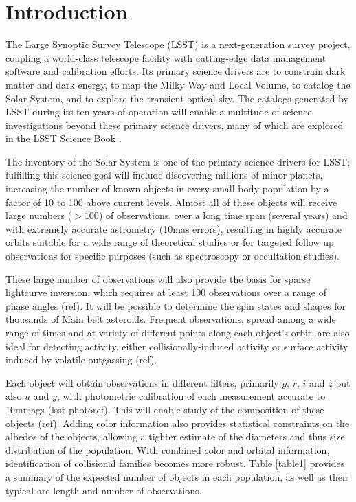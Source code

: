 \documentclass{iau}
\begin{document}
\section{Introduction}

The Large Synoptic Survey Telescope (LSST) is a next-generation survey
project, coupling a world-class telescope facility with cutting-edge
data management software and calibration efforts. Its primary science
drivers are to constrain dark matter and dark energy, to map the Milky
Way and Local Volume, to catalog the Solar System, and to explore
the transient optical sky. The catalogs generated by LSST during its
ten years of operation will enable a multitude of science
investigations beyond these primary science drivers, many of which are
explored in the LSST Science Book \cite{scibook}.

The inventory of the Solar System is one of the primary science
drivers for LSST; fulfilling this science goal will include
discovering millions of minor planets, increasing the number of known
objects in every small body population by a factor of 10 to 100 above
current levels. Almost all of these objects will receive large numbers
($>100$) of observations, over a long time span (several years) and with
extremely accurate astrometry (10mas errors), resulting in highly
accurate orbits suitable for a wide range of theoretical studies or
for targeted follow up observations for specific purposes (such as
spectroscopy or occultation studies).

These large number of observations will also provide the basis for
sparse lightcurve inversion, which requires at least 100 observations
over a range of phase angles (ref). It will be possible to determine
the spin states and shapes for thousands of Main belt
asteroids. Frequent observations, spread among a wide range of times
and at variety of different points along each object's orbit, are also
ideal for detecting activity, either collisionally-induced activity or
surface activity induced by volatile outgassing (ref).

Each object will obtain observations in different filters, primarily $g$,
$r$, $i$ and $z$ but also $u$ and $y$, with photometric calibration of
each measurement accurate to 10mmags (lsst photoref). This will enable study of the
composition of these objects (ref). Adding color information also
provides statistical constraints on the albedos of the objects,
allowing a tighter estimate of the diameters and thus size
distribution of the population. With combined color and orbital
information, identification of collisional families becomes more
robust. Table \ref{table1} provides a summary of the expected number
of objects in each population, as well as their typical arc length and
number of observations.
\end{document}
